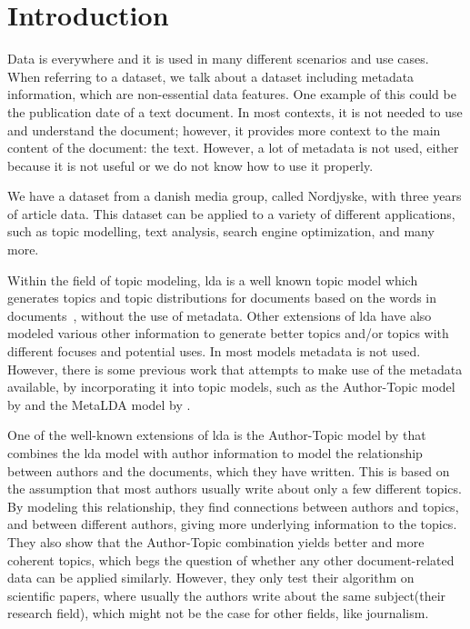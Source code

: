 \section{Introduction}\label{sec:introduction}
Data is everywhere and it is used in many different scenarios and use cases. 
When referring to a dataset, we talk about a dataset including metadata information, which are non-essential data features.
One example of this could be the publication date of a text document. 
In most contexts, it is not needed to use and understand the document; however, it provides more context to the main content of the document: the text.
However, a lot of metadata is not used, either because it is not useful or we do not know how to use it properly.

We have a dataset from a danish media group, called Nordjyske, with three years of article data.
This dataset can be applied to a variety of different applications, such as topic modelling\cite{blei2003latent}\cite{MetaLDA2017}, text analysis\cite{baly2020written}, search engine optimization\cite{amjad2015topic}, and many more.

Within the field of topic modeling, \Gls{lda} is a well known topic model which generates topics and topic distributions for documents based on the words in documents~\cite{blei2003latent}, without the use of metadata.
Other extensions of \gls{lda} have also modeled various other information to generate better topics and/or topics with different focuses and potential uses.
In most models metadata is not used.
However, there is some previous work that attempts to make use of the metadata available, by incorporating it into topic models, such as the Author-Topic model by \citet{author_topic_2012} and the MetaLDA model by \citet{MetaLDA2017}.

One of the well-known extensions of \gls{lda} is the Author-Topic model by \citet{author_topic_2012} that combines the \gls{lda} model with author information to model the relationship between authors and the documents, which they have written.
This is based on the assumption that most authors usually write about only a few different topics.
By modeling this relationship, they find connections between authors and topics, and between different authors, giving more underlying information to the topics.
They also show that the Author-Topic combination yields better and more coherent topics, which begs the question of whether any other document-related data can be applied similarly.
However, they only test their algorithm on scientific papers, where usually the authors write about the same subject(their research field), which might not be the case for other fields, like journalism. 

